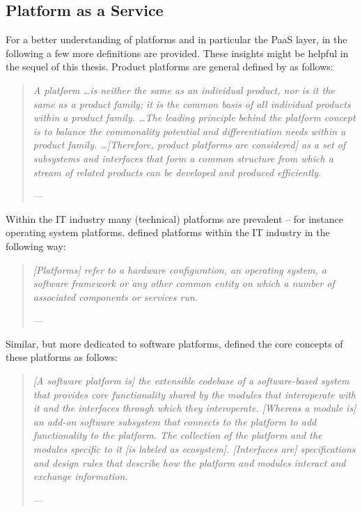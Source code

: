 \subsection{Platform as a Service}

For a better understanding of platforms and in particular the \ac{PaaS} layer, in the following a few more definitions are provided. These insights might be helpful in the sequel of this thesis. Product platforms are general defined by \citet{Halman2003} as follows:

\begin{quotation}{\slshape 
A platform \ldots is neither the same as an individual product, nor is it the same as a product family; it is the common basis of all individual products within a product family. \ldots The leading principle behind the platform concept is to balance the commonality potential and differentiation needs within a product family. \ldots [Therefore, product platforms are considered] as a set of subsystems and interfaces that form a common structure from which a stream of related products can be developed and produced efficiently.}
\vspace*{-7pt}
\begin{flushright}
	--- \citealp[pp. 150-151]{Halman2003}
\end{flushright}
\end{quotation}

Within the IT industry many (technical) platforms are prevalent -- for instance operating system platforms. \citet{Beimborn2011} defined platforms within the IT industry in the following way:

\begin{quotation}{\slshape 
[Platforms] refer to a hardware configuration, an operating system, a software framework or any other common entity on which a number of associated components or services run.}
\vspace*{-7pt}
\begin{flushright}
	--- \citealp[p. 88]{Beimborn2011}
\end{flushright}
\end{quotation}

Similar, but more dedicated to software platforms, \citet{Tiwana2010} defined the core concepts of these platforms as follows:

\begin{quotation}{\slshape 
[A software platform is] the extensible codebase of a software-based system that provides core functionality shared by the modules that interoperate with it and the interfaces through which they interoperate. [Whereas a module is] an add-on software subsystem that connects to the platform to add functionality to the platform. The collection of the platform and the modules specific to it [is labeled as ecosystem]. [Interfaces are] specifications and design rules that describe how the platform and modules interact and exchange information.}
\vspace*{-7pt}
\begin{flushright}
	--- \citealp[p. 676]{Tiwana2010}
\end{flushright}
\end{quotation}

